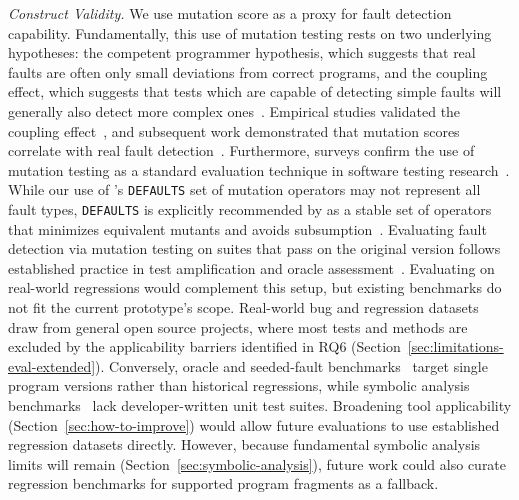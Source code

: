 \textit{Construct Validity.}
We use mutation score as a proxy for fault detection capability.
Fundamentally, this use of mutation testing
rests on two underlying hypotheses:
the competent programmer hypothesis,
which suggests that real faults are often
only small deviations from correct programs,
and the coupling effect,
which suggests that tests which are capable of detecting simple faults
will generally also detect more complex ones~\cite{demillo_1978_hints}.
Empirical studies validated the coupling effect~\cite{offutt_1992_coupling},
and subsequent work demonstrated that mutation scores correlate
with real fault detection~\cite{just_2014_mutants,papadakis_2018_correlation}.
Furthermore, surveys confirm the use
of mutation testing as a standard evaluation technique
in software testing research~\cite{jia_2011_analysis,papadakis_2019_mutation}.
%
While our use of \ToolPit{}'s \texttt{DEFAULTS} set of mutation operators
may not represent all fault types,
\texttt{DEFAULTS} is explicitly recommended by
\ToolPit{} as a stable set of operators
that minimizes equivalent mutants and avoids subsumption~\cite{coles_2021_less_is_more, coles_pit_mutators}.
%
Evaluating fault detection via mutation testing on suites that pass on the original version follows established practice in test amplification and oracle assessment~\cite{danglot_2019_dspot,tasnim_2026_togbench}.
Evaluating on real-world regressions would complement this setup, but existing benchmarks do not fit the current prototype's scope.
Real-world bug and regression datasets~\cite{just_2014_defects4j,saha_2018_bugsjar,madeiral_2019_bears,song_2022_regminer,silva_2024_gitbug} draw from general open source projects, where most tests and methods are excluded by the applicability barriers identified in RQ6 (Section~\ref{sec:limitations-eval-extended}).
Conversely, oracle and seeded-fault benchmarks~\cite{lin_2017_quixbugs,tasnim_2026_togbench} target single program versions rather than historical regressions, while symbolic analysis benchmarks~\cite{badihi_2021_eqbench,beyer_2026_svcomp} lack developer-written unit test suites.
Broadening tool applicability (Section~\ref{sec:how-to-improve}) would allow future evaluations to use established regression datasets directly.
However, because fundamental symbolic analysis limits will remain (Section~\ref{sec:symbolic-analysis}), future work could also curate regression benchmarks for supported program fragments as a fallback.

